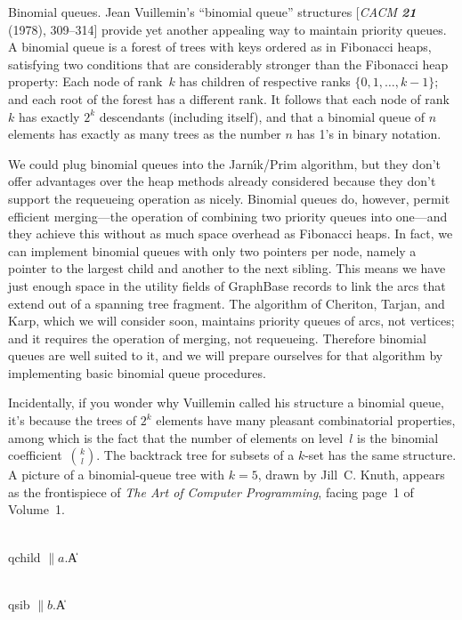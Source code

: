 Binomial queues.
Jean Vuillemin's ``binomial queue'' structures [{\sl CACM\/ \bf21} (1978),
309--314] provide yet another appealing way to maintain priority queues.
A binomial queue is a forest of trees with keys ordered as in Fibonacci
heaps, satisfying two conditions that are considerably stronger than
the Fibonacci heap property: Each node of rank~$k$ has children of
respective ranks $\{0,1,\ldots,k-1\}$; and each root of the forest
has a different rank. It follows that each node of rank~$k$ has exactly
$2^k$ descendants (including itself), and that a binomial queue of
$n$ elements has exactly as many trees as the number $n$ has 1's in
binary notation.

We could plug binomial queues into the Jarn{\'\i}k/Prim algorithm, but
they don't offer advantages over the heap methods already considered
because they don't support the requeueing operation as nicely.
Binomial queues do, however, permit efficient merging---the operation
of combining two priority queues into one---and they achieve this
without as much space overhead as Fibonacci heaps. In fact, we can
implement binomial queues with only two pointers per node, namely a
pointer to the largest child and another to the next sibling. This means we
have just enough space in the utility fields of GraphBase  records
to link the arcs that extend out of a spanning tree fragment. The
algorithm of Cheriton, Tarjan, and Karp, which we will consider
soon, maintains priority queues of arcs, not vertices; and it
requires the operation of merging, not requeueing. Therefore binomial
queues are well suited to it, and we will prepare ourselves for that
algorithm by implementing basic binomial queue procedures.

Incidentally, if you wonder why Vuillemin called his structure a
binomial queue, it's because the trees of $2^k$ elements have many
pleasant combinatorial properties, among which is the fact that the
number of elements on level~$l$ is the binomial coefficient~$k\choose
l$. The backtrack tree for subsets of a $k$-set has the same
structure. A picture of a binomial-queue tree with $k=5$, drawn by
Jill~C. Knuth, appears as the frontispiece of {\sl The Art of Computer
Programming}, facing page~1 of Volume~1.

\Y\B\4\D\\{qchild}\5
$\|a.{}$\|A\par
\B\4\D\\{qsib}\5
$\|b.{}$\|A\par
\fi

